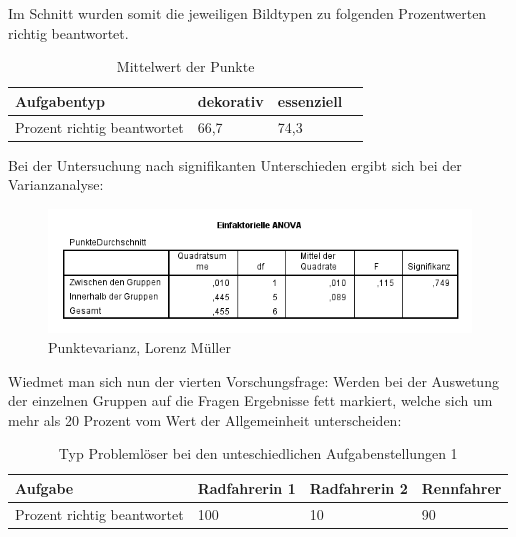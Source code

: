 Im Schnitt wurden somit die jeweiligen Bildtypen zu folgenden Prozentwerten richtig beantwortet. 

\begin{table}[!h]
\hspace{-5pt}
\begin{tabularx}{\textwidth + 5pt}{| @{\hspace{3pt}} M || @{\hspace{3pt}} M  | @{\hspace{3pt}} M | @{\hspace{3pt}} M |}
\hline
\textbf{Aufgabentyp} & \textbf{dekorativ} & \textbf{essenziell} \\
\hline
\hline
Prozent richtig beantwortet       & 66,7 & 74,3 \\
\hline
\end{tabularx}
\caption{Mittelwert der Punkte}
\end{table}

Bei der Untersuchung nach signifikanten Unterschieden ergibt sich bei der Varianzanalyse:


\begin{figure}[!ht]
\noindent\hspace{0.5mm}\includegraphics[width=15cm]{./Ressourcen/Aufgabenuntescheidung.png}
\caption{Punktevarianz, Lorenz Müller}
\end{figure}




Wiedmet man sich nun der vierten Vorschungsfrage:
Werden bei der Auswetung der einzelnen Gruppen auf die Fragen Ergebnisse fett markiert, welche sich um mehr als 20 Prozent vom Wert der Allgemeinheit unterscheiden:

\begin{table}[!h]
\hspace{-5pt}
\begin{tabularx}{\textwidth + 5pt}{| @{\hspace{3pt}} M || @{\hspace{3pt}} M  | @{\hspace{3pt}} M | @{\hspace{3pt}} M |}
\hline
\textbf{Aufgabe} & \textbf{Radfahrerin 1} & \textbf{Radfahrerin 2} & \textbf{Rennfahrer} \\
\hline
\hline
Prozent richtig beantwortet       & 100 & 10 & 90 \\
\hline
\end{tabularx}
\caption{Typ Problemlöser bei den unteschiedlichen Aufgabenstellungen 1}
\end{table}


